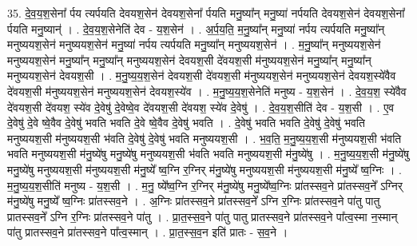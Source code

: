 \documentclass[17pt]{extarticle}
\begin{document}
35. दे॒व॒य॒श॒सेना᳚ र्पय त्यर्पयति देवयश॒सेन॑ देवयश॒सेना᳚ र्पयति मनु॒ष्या᳚न् मनु॒ष्या॑ नर्पयति देवयश॒सेन॑ देवयश॒सेना᳚ र्पयति मनु॒ष्यान्॑ । . दे॒व॒य॒श॒सेनेति॑ देव - य॒श॒सेन॑ । . अ॒र्प॒य॒ति॒ म॒नु॒ष्या᳚न् मनु॒ष्या॑ नर्पय त्यर्पयति मनु॒ष्या᳚न् मनुष्ययश॒सेन॑ मनुष्ययश॒सेन॑ मनु॒ष्या॑ नर्पय त्यर्पयति मनु॒ष्या᳚न् मनुष्ययश॒सेन॑ । . म॒नु॒ष्या᳚न् मनुष्ययश॒सेन॑ मनुष्ययश॒सेन॑ मनु॒ष्या᳚न् मनु॒ष्या᳚न् मनुष्ययश॒सेन॑ देवयश॒सी दे॑वयश॒सी म॑नुष्ययश॒सेन॑ मनु॒ष्या᳚न् मनु॒ष्या᳚न् मनुष्ययश॒सेन॑ देवयश॒सी । . म॒नु॒ष्य॒य॒श॒सेन॑ देवयश॒सी दे॑वयश॒सी म॑नुष्ययश॒सेन॑ मनुष्ययश॒सेन॑ देवयश॒स्ये॑वैव दे॑वयश॒सी म॑नुष्ययश॒सेन॑ मनुष्ययश॒सेन॑ देवयश॒स्ये॑व । . म॒नु॒ष्य॒य॒श॒सेनेति॑ मनुष्य - य॒श॒सेन॑ । . दे॒व॒य॒श॒ स्ये॑वैव दे॑वयश॒सी दे॑वयश॒ स्ये॑व दे॒वेषु॑ दे॒वेष्वे॒व दे॑वयश॒सी दे॑वयश॒ स्ये॑व दे॒वेषु॑ । . दे॒व॒य॒श॒सीति॑ देव - य॒श॒सी । . ए॒व दे॒वेषु॑ दे॒वे ष्वे॒वैव दे॒वेषु॑ भवति भवति दे॒वे ष्वे॒वैव दे॒वेषु॑ भवति । . दे॒वेषु॑ भवति भवति दे॒वेषु॑ दे॒वेषु॑ भवति मनुष्ययश॒सी म॑नुष्ययश॒सी भ॑वति दे॒वेषु॑ दे॒वेषु॑ भवति मनुष्ययश॒सी । . भ॒व॒ति॒ म॒नु॒ष्य॒य॒श॒सी म॑नुष्ययश॒सी भ॑वति भवति मनुष्ययश॒सी म॑नु॒ष्ये॑षु मनु॒ष्ये॑षु मनुष्ययश॒सी भ॑वति भवति मनुष्ययश॒सी म॑नु॒ष्ये॑षु । . म॒नु॒ष्य॒य॒श॒सी म॑नु॒ष्ये॑षु मनु॒ष्ये॑षु मनुष्ययश॒सी म॑नुष्ययश॒सी म॑नु॒ष्ये᳚ ष्व॒ग्नि र॒ग्निर् म॑नु॒ष्ये॑षु मनुष्ययश॒सी म॑नुष्ययश॒सी म॑नु॒ष्ये᳚ ष्व॒ग्निः । . म॒नु॒ष्य॒य॒श॒सीति॑ मनुष्य - य॒श॒सी । . म॒नु॒ ष्ये᳚ष्व॒ग्नि र॒ग्निर् म॑नु॒ष्ये॑षु मनु॒ष्ये᳚ष्व॒ग्निः प्रा॑तस्सव॒ने प्रा॑तस्सव॒ने᳚ ऽग्निर् म॑नु॒ष्ये॑षु मनु॒ष्ये᳚ ष्व॒ग्निः प्रा॑तस्सव॒ने । . अ॒ग्निः प्रा॑तस्सव॒ने प्रा॑तस्सव॒ने᳚ ऽग्नि र॒ग्निः प्रा॑तस्सव॒ने पा॑तु पातु प्रातस्सव॒ने᳚ ऽग्नि र॒ग्निः प्रा॑तस्सव॒ने पा॑तु । . प्रा॒त॒स्स॒व॒ने पा॑तु पातु प्रातस्सव॒ने प्रा॑तस्सव॒ने पा᳚त्व॒स्मा न॒स्मान् पा॑तु प्रातस्सव॒ने प्रा॑तस्सव॒ने पा᳚त्व॒स्मान् । . प्रा॒त॒स्स॒व॒न इति॑ प्रातः - स॒व॒ने । \newline
\end{document}
